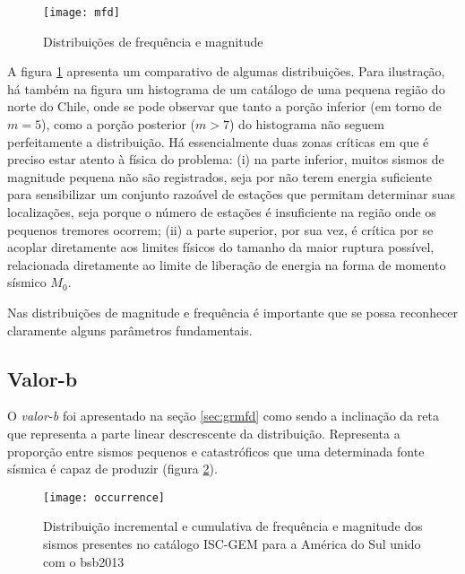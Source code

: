 \begin{figure}[H]
   \centering
   \texttt{[image: mfd]}
   \caption[Distribuições de frequência e magnitude]
   		   {Distribuições de frequência e magnitude} 
   \label{f:mfd}
\end{figure} 

A figura \ref{f:mfd} apresenta um comparativo de algumas distribuições. Para ilustração, 
há também na figura um histograma de um catálogo de
uma pequena região do norte do Chile, onde se pode observar que tanto a porção inferior (em torno de $m=5$), como a porção
posterior ($m > 7$) do histograma não seguem perfeitamente a distribuição. Há essencialmente duas zonas críticas em que é preciso
estar atento à física do problema:
(i) na parte inferior, muitos sismos de magnitude pequena não são registrados, seja por não terem energia suficiente
para sensibilizar um conjunto razoável de estações que permitam determinar suas localizações, seja porque o número de
estações é insuficiente na região onde os pequenos tremores ocorrem; (ii) a parte superior, por sua vez, é crítica
por se acoplar diretamente aos limites físicos do tamanho da maior ruptura possível, relacionada diretamente ao limite de liberação de energia na forma de momento sísmico $M_0$.

Nas distribuições de magnitude e frequência é importante que se possa reconhecer claramente alguns parâmetros
fundamentais.

\subsection{Valor-b}
\label{sec:b_value}

O \emph{valor-b} foi apresentado na seção \ref{sec:grmfd} como sendo a inclinação da reta que representa a parte linear
descrescente da distribuição. Representa a proporção entre sismos pequenos e catastróficos que uma determinada fonte
sísmica é capaz de produzir (figura \ref{f:occurrence}).

\begin{figure}[H]
   \centering
   \texttt{[image: occurrence]}
   \caption[Distribuição incremental e cumulativa de frequência e magnitude dos sismos presentes no catálogo ISC-GEM
   para a América do Sul unido com o \gls{bsb2013}]
   {Distribuição incremental e cumulativa de frequência e magnitude dos sismos presentes no catálogo ISC-GEM
   para a América do Sul unido com o \gls{bsb2013}} 
   \label{f:occurrence}
\end{figure} 
 



